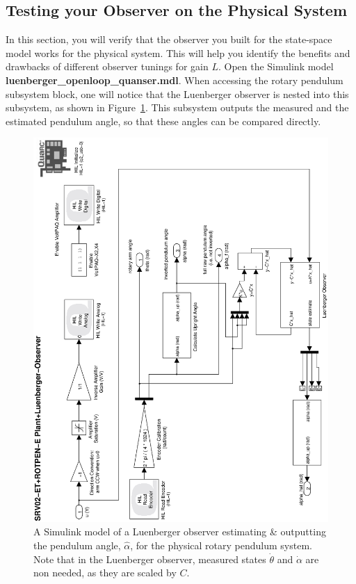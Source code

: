 \subsection{Testing your Observer on the Physical System}\label{sub section:lab3_observer_test}
In this section, you will verify that the observer you built for the state-space model works for the physical system. This will help you identify the benefits and drawbacks of different observer tunings for gain $L$. Open the Simulink model \textbf{luenberger\_openloop\_quanser.mdl}. When accessing the rotary pendulum subsystem block, one will notice that the Luenberger observer is nested into this subsystem, as shown in Figure~\ref{figure:lab3_luenberger_openloop_quanser}. This subsystem outputs the measured and the estimated pendulum angle, so that these angles can be compared directly.
\begin{figure}[htb!]
    \centering
    \includegraphics[width=0.6\linewidth,angle=-90]{eps/lab_3/luenberger_openloop_quanser}
    \caption{A Simulink model of a Luenberger observer estimating \& outputting the pendulum angle, $\hat{\alpha}$, for the physical rotary pendulum system. Note that in the Luenberger observer, measured states $\dot{\theta}$ and $\dot{\alpha}$ are non needed, as they are scaled by $C$.}
    \label{figure:lab3_luenberger_openloop_quanser}
\end{figure}
\newpage
